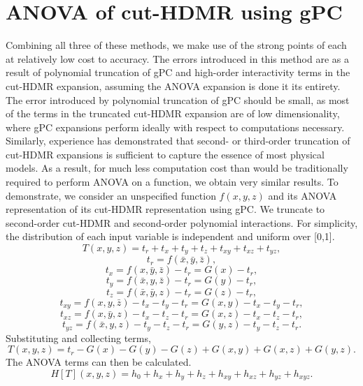 \documentclass[11pt]{article}
\begin{document}
\section{ANOVA of cut-HDMR using gPC}
Combining all three of these methods, we make use of the strong points of each at relatively low cost to
accuracy.  The errors introduced in this method are as a result of polynomial truncation of gPC and high-order
interactivity terms in the cut-HDMR expansion, assuming the ANOVA expansion is done it its entirety.  The
error introduced by polynomial truncation of gPC should be small, as most of the terms in the truncated cut-HDMR
expansion are of low dimensionality, where gPC expansions perform ideally with respect to computations
necessary.  Similarly, experience has demonstrated that second- or third-order truncation of cut-HDMR
expansions is sufficient to capture the essence of most physical models.  As a result, for much less
computation cost than would be traditionally required to perform ANOVA on a function, we obtain very similar
results.  To demonstrate, we consider an unspecified function $f(x,y,z)$ and its ANOVA representation of its
cut-HDMR representation using gPC.  We truncate to second-order cut-HDMR and second-order polynomial
interactions.  For simplicity, the distribution of each input variable is independent and uniform over [0,1].
\begin{equation}
  T(x,y,z) = t_r + t_x + t_y + t_z + t_{xy} + t_{xz} + t_{yz},
\end{equation}
\begin{equation}
  t_r = f(\bar x, \bar y, \bar z),
\end{equation}
\begin{equation}
  t_x = f(x, \bar y, \bar z) - t_r = G(x) - t_r,
\end{equation}
\begin{equation}
  t_y = f(\bar x, y, \bar z) - t_r = G(y) - t_r,
\end{equation}
\begin{equation}
  t_z = f(\bar x, \bar y, z) - t_r = G(z) - t_r,
\end{equation}
\begin{equation}
  t_{xy} = f(x, y, \bar z) - t_x - t_y - t_r = G(x,y) - t_x - t_y - t_r,
\end{equation}
\begin{equation}
  t_{xz} = f(x, \bar y, z) - t_x - t_z - t_r = G(x,z) - t_x - t_z - t_r,
\end{equation}
\begin{equation}
  t_{yz} = f(\bar x, y, z) - t_y - t_z - t_r = G(y,z) - t_y - t_z - t_r.
\end{equation}
Substituting and collecting terms,
\begin{equation}
  T(x,y,z) = t_r - G(x) - G(y) - G(z) + G(x,y) + G(x,z) + G(y,z).
\end{equation}
The ANOVA terms can then be calculated.
\begin{equation}
  H[T](x,y,z) = h_0 + h_x + h_y + h_z + h_{xy} + h_{xz} + h_{yz} + h_{xyz}.
\end{equation}
\end{document}
